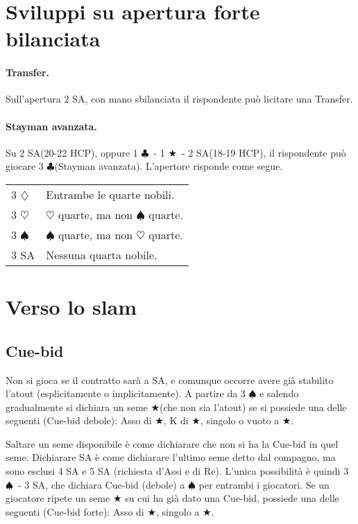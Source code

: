\documentclass[a4paper,10pt]{article}
\renewcommand{\c}{$\clubsuit$\xspace}
\renewcommand{\d}{$\diamondsuit$\xspace}
\newcommand{\h}{$\heartsuit$\xspace}
\newcommand{\s}{$\spadesuit$\xspace}
\renewcommand{\j}{$\bigstar$\xspace}
\newcommand{\sa}{SA\xspace}
\newcommand{\smallspace}{\vskip0.3cm}
\newenvironment{twocol}
  {\smallspace\noindent\begin{tabular}{l p{0.8\textwidth}}}
  {\end{tabular}\smallspace}
\begin{document}
\pagebreak

\section{Sviluppi su apertura forte bilanciata}

\paragraph{Transfer.} Sull'apertura 2 \sa, con mano sbilanciata il rispondente può licitare una Transfer.

\paragraph{Stayman avanzata.} Su 2 \sa (20-22 HCP), oppure 1 \c\ - 1 \j\ - 2 \sa (18-19 HCP), il rispondente può giocare 3 \c (Stayman avanzata). L'apertore risponde come segue.
\begin{twocol}
 3 \d & Entrambe le quarte nobili.\\
 3 \h & \h quarte, ma non \s quarte.\\
 3 \s & \s quarte, ma non \h quarte.\\
 3 \sa & Nessuna quarta nobile.
\end{twocol}



\pagebreak

\section{Verso lo slam}

\subsection{Cue-bid}

Non si gioca se il contratto sarà a SA, e comunque occorre avere già stabilito l'atout (esplicitamente o implicitamente). A partire da 3 \s e salendo gradualmente si dichiara un seme \j (che non sia l'atout) se si possiede una delle seguenti (Cue-bid debole): Asso di \j, K di \j, singolo o vuoto a \j.

Saltare un seme disponibile è come dichiarare che non si ha la Cue-bid in quel seme. Dichiarare SA è come dichiarare l'ultimo seme detto dal compagno, ma sono esclusi 4 SA e 5 SA (richiesta d'Assi e di Re). L'unica possibilità è quindi 3 \s\ - 3 SA, che dichiara Cue-bid (debole) a \s per entrambi i giocatori. Se un giocatore ripete un seme \j su cui ha già dato una Cue-bid, possiede una delle seguenti (Cue-bid forte): Asso di \j, singolo a \j.
\end{document}
